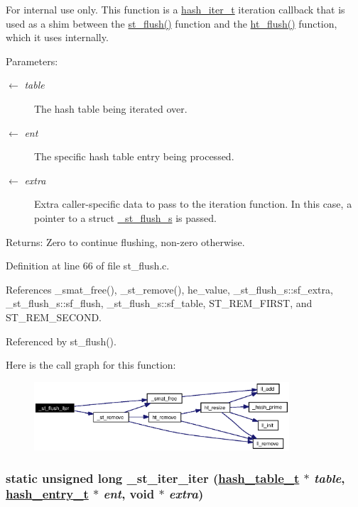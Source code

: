 \begin{Desc}
\item[For internal use only.]
This function is a \hyperlink{group__dbprim__hash_ga3}{hash\_\-iter\_\-t} iteration callback that is used as a shim between the \hyperlink{group__dbprim__smat_ga17}{st\_\-flush()} function and the \hyperlink{group__dbprim__hash_ga15}{ht\_\-flush()} function, which it uses internally.

\begin{Desc}
\item[Parameters:]
\begin{description}
\item[\mbox{$\leftarrow$} {\em table}]The hash table being iterated over. \item[\mbox{$\leftarrow$} {\em ent}]The specific hash table entry being processed. \item[\mbox{$\leftarrow$} {\em extra}]Extra caller-specific data to pass to the iteration function. In this case, a pointer to a struct \hyperlink{struct__st__flush__s}{\_\-st\_\-flush\_\-s} is passed.\end{description}
\end{Desc}
\begin{Desc}
\item[Returns:]Zero to continue flushing, non-zero otherwise.\end{Desc}
\end{Desc}


Definition at line 66 of file st\_\-flush.c.

References \_\-smat\_\-free(), \_\-st\_\-remove(), he\_\-value, \_\-st\_\-flush\_\-s::sf\_\-extra, \_\-st\_\-flush\_\-s::sf\_\-flush, \_\-st\_\-flush\_\-s::sf\_\-table, ST\_\-REM\_\-FIRST, and ST\_\-REM\_\-SECOND.

Referenced by st\_\-flush().

Here is the call graph for this function:\begin{figure}[H]
\begin{center}
\leavevmode
\includegraphics[width=269pt]{group__dbprim__smat_ga30_cgraph}
\end{center}
\end{figure}
\hypertarget{group__dbprim__smat_ga31}{
\subsubsection[\_\-st\_\-iter\_\-iter]{\setlength{\rightskip}{0pt plus 5cm}static unsigned long \_\-st\_\-iter\_\-iter (\hyperlink{struct__hash__table__s}{hash\_\-table\_\-t} $\ast$ {\em table}, \hyperlink{struct__hash__entry__s}{hash\_\-entry\_\-t} $\ast$ {\em ent}, void $\ast$ {\em extra})}}
\label{group__dbprim__smat_ga31}


